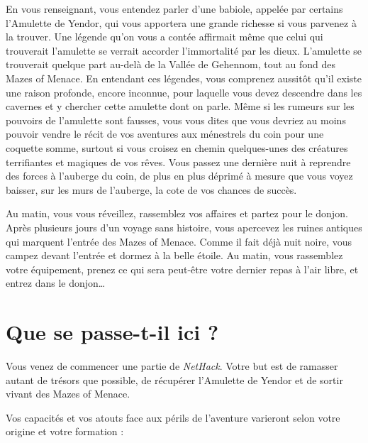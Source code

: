 \documentclass[titlepage]{article}
\begin{document}
En vous renseignant, vous entendez parler d'une babiole, appelée par certains
l'Amulette de Yendor, qui vous apportera une grande richesse si vous parvenez
à la trouver.  Une légende qu'on vous a contée affirmait même que celui qui
trouverait l'amulette se verrait accorder l'immortalité par les dieux.
L'amulette se trouverait quelque part au-delà de la Vallée de Gehennom, tout
au fond des Mazes of Menace.  En entendant ces légendes, vous comprenez
aussitôt qu'il existe une raison profonde, encore inconnue, pour laquelle
vous devez descendre dans les cavernes et y chercher cette amulette dont on
parle.  Même si les rumeurs sur les pouvoirs de l'amulette sont fausses, vous
vous dites que vous devriez au moins pouvoir vendre le récit de vos aventures
aux ménestrels du coin pour une coquette somme, surtout si vous croisez en
chemin quelques-unes des créatures terrifiantes et magiques de vos rêves.
Vous passez une dernière nuit à reprendre des forces à l'auberge du coin,
de plus en plus déprimé à mesure que vous voyez baisser, sur les murs de
l'auberge, la cote de vos chances de succès.

\noindent Au matin, vous vous réveillez, rassemblez vos affaires et
partez pour le donjon.  Après plusieurs jours d'un voyage
sans histoire, vous apercevez les ruines antiques qui marquent l'entrée des
Mazes of Menace.  Comme il fait déjà nuit noire, vous campez devant l'entrée
et dormez à la belle étoile.  Au matin, vous rassemblez votre équipement,
prenez ce qui sera peut-être votre dernier repas à l'air libre, et entrez
dans le donjon\ldots

\section{Que se passe-t-il ici ?}

Vous venez de commencer une partie de \textit{NetHack}.  Votre but est de ramasser
autant de trésors que possible, de récupérer l'Amulette de Yendor et de
sortir vivant des Mazes of Menace.

Vos capacités et vos atouts face aux périls de l'aventure
varieront selon votre origine et votre formation :
\end{document}
